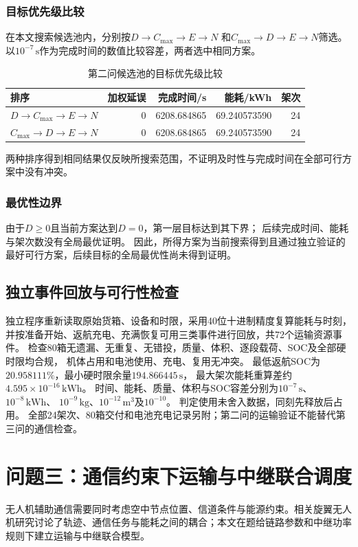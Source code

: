 \documentclass[bwprint]{gmcmthesis}
\begin{document}
\subsubsection{目标优先级比较}
在本文搜索候选池内，分别按$D\rightarrow C_{\max}\rightarrow E\rightarrow N$
和$C_{\max}\rightarrow D\rightarrow E\rightarrow N$筛选。
以$10^{-7}\,\mathrm{s}$作为完成时间的数值比较容差，两者选中相同方案。
\begin{table}[htbp]
\centering
\small
\caption{第二问候选池的目标优先级比较}
\label{tab:q2_priority}
\begin{tabular}{lrrrr}
\toprule
排序 & 加权延误 & 完成时间/s & 能耗/kWh & 架次 \\
\midrule
$D\to C_{\max}\to E\to N$ & 0 & 6208.684865 & 69.240573590 & 24 \\
$C_{\max}\to D\to E\to N$ & 0 & 6208.684865 & 69.240573590 & 24 \\
\bottomrule
\end{tabular}
\end{table}

两种排序得到相同结果仅反映所搜索范围，不证明及时性与完成时间在全部可行方案中没有冲突。

\subsubsection{最优性边界}
由于$D\geq0$且当前方案达到$D=0$，第一层目标达到其下界；
后续完成时间、能耗与架次数没有全局最优证明。
因此，所得方案为当前搜索得到且通过独立验证的最好可行方案，后续目标的全局最优性尚未得到证明。

\subsection{独立事件回放与可行性检查}
独立程序重新读取原始货箱、设备和时限，采用40位十进制精度复算能耗与时刻，
并按准备开始、返航充电、充满恢复可用三类事件进行回放，共72个运输资源事件。
检查80箱无遗漏、无重复、无错投，质量、体积、逐段载荷、SOC及全部硬时限均合规，
机体占用和电池使用、充电、复用无冲突。
最低返航SOC为$20.958111\%$，最小硬时限余量$194.866445\,\mathrm{s}$，
最大架次能耗重算差约$4.595\times10^{-16}\,\mathrm{kWh}$。
时间、能耗、质量、体积与SOC容差分别为$10^{-7}\,\mathrm{s}$、$10^{-8}\,\mathrm{kWh}$、
$10^{-9}\,\mathrm{kg}$、$10^{-12}\,\mathrm{m^3}$及$10^{-10}$。
判定使用未舍入数据，同刻先释放后占用。
全部24架次、80箱交付和电池充电记录另附；第二问的运输验证不能替代第三问的通信检查。

\section{问题三：通信约束下运输与中继联合调度}
无人机辅助通信需要同时考虑空中节点位置、信道条件与能源约束\cite{zeng2016}。相关旋翼无人机研究讨论了轨迹、通信任务与能耗之间的耦合\cite{zeng2019}；本文在题给链路参数和中继功率规则下建立运输与中继联合模型。
\end{document}
